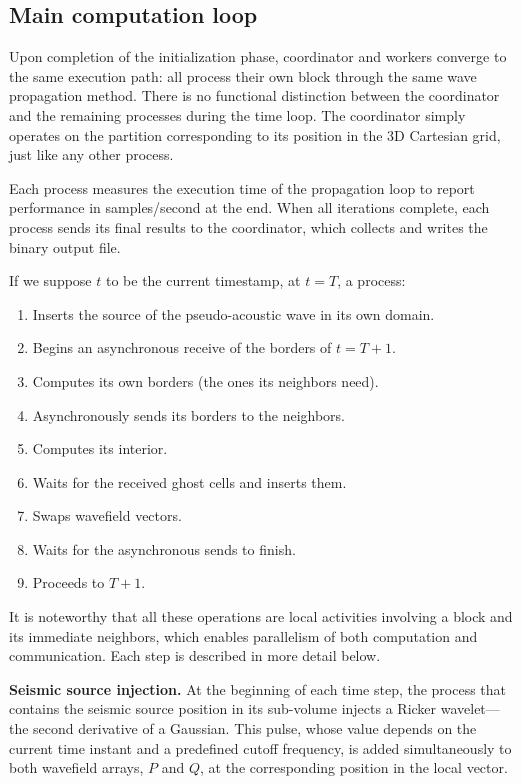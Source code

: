 \documentclass[cic,tc,english]{infufrgs}
\begin{document}
\subsection{Main computation loop}
Upon completion of the initialization phase, coordinator and workers
converge to the same execution path: all process their own block
through the same wave propagation method. There is no functional
distinction between the coordinator and the remaining processes during
the time loop. The coordinator simply operates on the partition
corresponding to its position in the 3D Cartesian grid, just like any
other process.

Each process measures the execution time of the propagation loop to
report performance in samples/second at the end. When all iterations
complete, each process sends its final results to the coordinator,
which collects and writes the binary output file.

If we suppose $t$ to be the current timestamp, at $t = T$, a process:

\begin{enumerate}
  \item Inserts the source of the pseudo-acoustic wave in its own domain.
  \item Begins an asynchronous receive of the borders of $t = T + 1$.
  \item Computes its own borders (the ones its neighbors need).
  \item Asynchronously sends its borders to the neighbors.
  \item Computes its interior.
  \item Waits for the received ghost cells and inserts them.
  \item Swaps wavefield vectors.
  \item Waits for the asynchronous sends to finish.
  \item Proceeds to $T + 1$.
\end{enumerate}

It is noteworthy that all these operations are local activities
involving a block and its immediate neighbors, which enables
parallelism of both computation and communication. Each step is
described in more detail below.

\textbf{Seismic source injection.}
At the beginning of each time step, the process that contains the
seismic source position in its sub-volume injects a Ricker wavelet---the
second derivative of a Gaussian. This pulse, whose value depends on
the current time instant and a predefined cutoff frequency, is added
simultaneously to both wavefield arrays, $P$ and $Q$, at the
corresponding position in the local vector.
\end{document}
